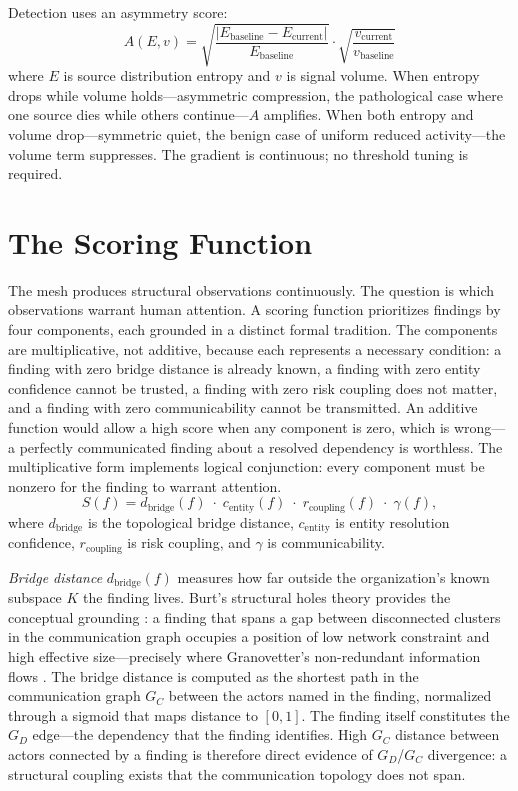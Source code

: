 \documentclass[11pt,a4paper]{article}
\begin{document}
Detection uses an asymmetry score:
\begin{equation}
A(E, v) = \sqrt{\frac{|E_{\text{baseline}} - E_{\text{current}}|}{E_{\text{baseline}}}} \cdot \sqrt{\frac{v_{\text{current}}}{v_{\text{baseline}}}}
\label{eq:asymmetry}
\end{equation}
where $E$ is source distribution entropy and $v$ is signal volume. When entropy drops while volume holds---asymmetric compression, the pathological case where one source dies while others continue---$A$ amplifies. When both entropy and volume drop---symmetric quiet, the benign case of uniform reduced activity---the volume term suppresses. The gradient is continuous; no threshold tuning is required.


\section{The Scoring Function}
\label{sec:scoring}

The mesh produces structural observations continuously. The question is which observations warrant human attention. A scoring function prioritizes findings by four components, each grounded in a distinct formal tradition. The components are multiplicative, not additive, because each represents a necessary condition: a finding with zero bridge distance is already known, a finding with zero entity confidence cannot be trusted, a finding with zero risk coupling does not matter, and a finding with zero communicability cannot be transmitted. An additive function would allow a high score when any component is zero, which is wrong---a perfectly communicated finding about a resolved dependency is worthless. The multiplicative form implements logical conjunction: every component must be nonzero for the finding to warrant attention.
\begin{equation}
\label{eq:scoring}
S(f) = d_{\text{bridge}}(f) \;\cdot\; c_{\text{entity}}(f) \;\cdot\; r_{\text{coupling}}(f) \;\cdot\; \gamma(f),
\end{equation}
where $d_{\text{bridge}}$ is the topological bridge distance, $c_{\text{entity}}$ is entity resolution confidence, $r_{\text{coupling}}$ is risk coupling, and $\gamma$ is communicability.

\emph{Bridge distance} $d_{\text{bridge}}(f)$ measures how far outside the organization's known subspace $K$ the finding lives. Burt's structural holes theory provides the conceptual grounding \citep{burt2004}: a finding that spans a gap between disconnected clusters in the communication graph occupies a position of low network constraint and high effective size---precisely where Granovetter's non-redundant information flows \citep{granovetter1973}. The bridge distance is computed as the shortest path in the communication graph $G_C$ between the actors named in the finding, normalized through a sigmoid that maps distance to $[0,1]$. The finding itself constitutes the $G_D$ edge---the dependency that the finding identifies. High $G_C$ distance between actors connected by a finding is therefore direct evidence of $G_D$/$G_C$ divergence: a structural coupling exists that the communication topology does not span.
\end{document}
